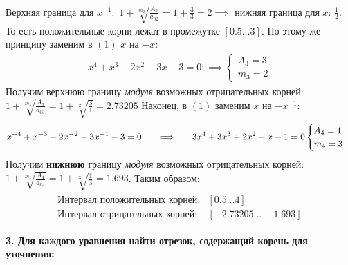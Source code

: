 Верхняя граница для $x^{-1}:$ $1+\sqrt[m_2]{\frac{A_2}{a_{02}}} = 1 +\frac{3}{3} = 2\implies$ нижняя граница для $x$: $\frac{1}{2}$. То есть положительные корни лежат в промежутке $[0.5\ldots3]$.
По этому же принципу заменим в $(1)$ $x$ на $-x$:
\begin{align}
    x^4+x^3-2x^2-3x-3=0; \implies
     \begin{cases}
        A_3 = 3 \\
        m_3 = 2
    \end{cases}
\end{align}
Получим верхнюю границу {\it модуля} возможных отрицательных корней: $1+\sqrt[m_3]{\frac{A_3}{a_{03}}} = 1 +\sqrt[2]{\frac{3}{1}} = 2.73205$
Наконец, в $(1)$ заменим $x$ на $-x^{-1}$:
\begin{align}
    x^{-4}+x^{-3}-2x^{-2}-3x^{-1}-3=0 \hspace{0.5cm} \implies \hspace{0.5cm}
    3x^4+3x^3+2x^2-x-1=0
    \begin{cases}
        A_4 = 1 \\
        m_4 = 3
    \end{cases}
\end{align}
Получим {\bf нижнюю} границу {\it модуля} возможных отрицательных корней: $1+\sqrt[m_4]{\frac{A_4}{a_{04}}} = 1 +\sqrt[3]{\frac{1}{3}} = 1.693$. Таким образом:
\begin{align}
    \begin{matrix}
        \text{Интервал положительных корней:} & [0.5 \ldots 4] \\
        \text{Интервал отрицательных корней:} & [-2.73205 \ldots -1.693]
    \end{matrix}
\end{align}

{\Large{\textbf{3. Для каждого уравнения найти отрезок, содержащий корень для уточнения:}}}\\

